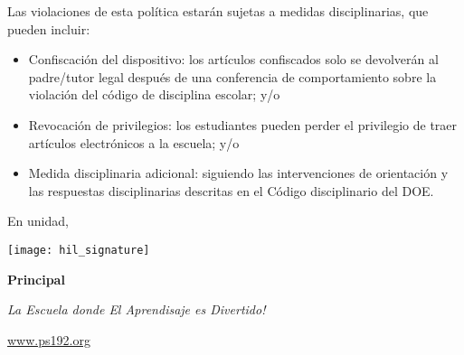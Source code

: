 \documentclass[12pt,letterpaper]{article}
\begin{document}
Las violaciones de esta política estarán sujetas a medidas disciplinarias, que pueden incluir:
\begin{itemize}
\item Confiscación del dispositivo: los artículos confiscados solo se devolverán al padre/tutor legal después de una conferencia de comportamiento sobre la violación del código de disciplina escolar; y/o
\item Revocación de privilegios: los estudiantes pueden perder el privilegio de traer artículos electrónicos a la escuela; y/o
\item Medida disciplinaria adicional: siguiendo las intervenciones de orientación y las respuestas disciplinarias descritas en el Código disciplinario del DOE.
\end{itemize}

En unidad,

\texttt{[image: hil\_signature]}

\textbf{Principal}

\textit{La Escuela donde El Aprendisaje es Divertido!}

\url{www.ps192.org}
\end{document}

